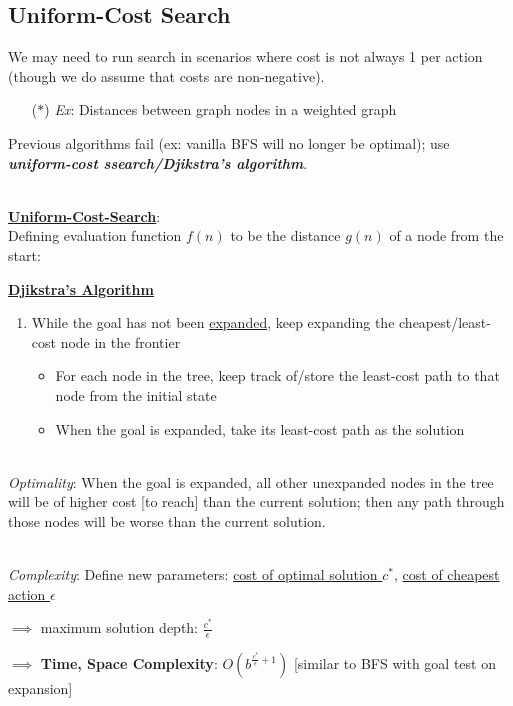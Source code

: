 \documentclass[12pt]{extarticle}
\theoremstyle{definition}
\theoremstyle{remark}
\newcommand{\pstart}[0]{\noindent}
\newcommand{\newp}[0]{~\\ \pstart}
\newcommand{\term}[1]{\noindent\textbf{\textit{#1}}}
\newcommand{\titleul}[1]{\noindent \textbf{\ul{#1}}}
\begin{document}
\pagebreak
\subsection{Uniform-Cost Search}
We may need to run search in scenarios where cost is not always 1 per action (though we do assume that costs are non-negative). \begin{itemize}
    \item[($\ast$)] \textit{Ex}: Distances between graph nodes in a weighted graph
\end{itemize}

\vspace{5pt}\pstart
Previous algorithms fail (ex: vanilla BFS will no longer be optimal); use \term{uniform-cost ssearch/Djikstra's algorithm}.

\newp
\titleul{Uniform-Cost-Search}: 
\vspace{6pt}\newp
Defining evaluation function $f(n)$ to be the distance $g(n)$ of a node from the start:
\begin{tcolorbox}[colback=blue!5!white]
    \titleul{Djikstra's Algorithm}
    \begin{enumerate}
        \item While the goal has not been \ul{expanded}, keep expanding the cheapest/least-cost node in the frontier \begin{itemize}
            \item For each node in the tree, keep track of/store the least-cost path to that node from the initial state
            \item When the goal is expanded, take its least-cost path as the solution
        \end{itemize}
    \end{enumerate}
\end{tcolorbox}

~\\ \pstart
\textit{Optimality}: When the goal is expanded, all other unexpanded nodes in the tree will be of higher cost [to reach] than the current solution; then any path through those nodes will be worse than the current solution.

~\\ \pstart
\textit{Complexity}: Define new parameters: \ul{cost of optimal solution $c^\ast$}, \ul{cost of cheapest action $\epsilon$} 

\vspace{5pt} \pstart
$\implies$ maximum solution depth: $\frac{c^\ast}{\epsilon}$

\vspace{5pt} \pstart
$\implies$ \textbf{Time, Space Complexity}: $O\left(b^{\frac{c^\ast}{\epsilon}+1}\right)$ [similar to BFS with goal test on expansion]
\end{document}
